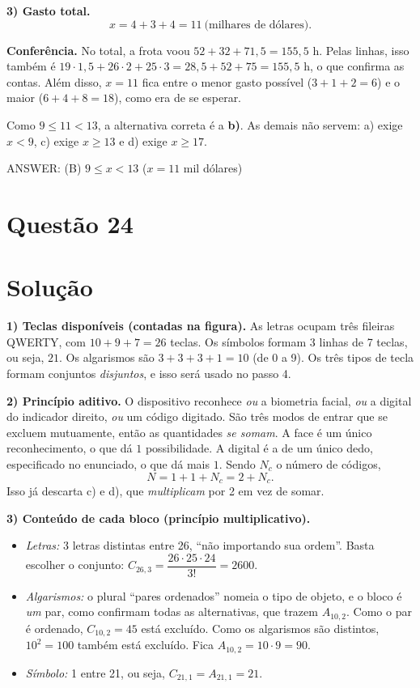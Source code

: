 \documentclass{article}%
\begin{document}
\textbf{3) Gasto total.}
\[
x=4+3+4=11 \ \text{(milhares de dólares)}.
\]

\textbf{Conferência.} No total, a frota voou $52+32+71{,}5=155{,}5$ h. Pelas linhas, isso também é $19\cdot 1{,}5+26\cdot 2+25\cdot 3=28{,}5+52+75=155{,}5$ h, o que confirma as contas. Além disso, $x=11$ fica entre o menor gasto possível ($3+1+2=6$) e o maior ($6+4+8=18$), como era de se esperar.

Como $9\le 11<13$, a alternativa correta é a \textbf{b)}. As demais não servem: a) exige $x<9$, c) exige $x\ge 13$ e d) exige $x\ge 17$.

\medskip
ANSWER: (B) $9 \le x < 13$ \quad ($x = 11$ mil dólares)%
\newpage%
\section*{Questão 24}

\section*{Solução}

\textbf{1) Teclas disponíveis (contadas na figura).} As letras ocupam três fileiras QWERTY, com $10+9+7=26$ teclas. Os símbolos formam 3 linhas de 7 teclas, ou seja, $21$. Os algarismos são $3+3+3+1=10$ (de 0 a 9). Os três tipos de tecla formam conjuntos \emph{disjuntos}, e isso será usado no passo 4.

\textbf{2) Princípio aditivo.} O dispositivo reconhece \emph{ou} a biometria facial, \emph{ou} a digital do indicador direito, \emph{ou} um código digitado. São três modos de entrar que se excluem mutuamente, então as quantidades \emph{se somam}. A face é um único reconhecimento, o que dá $1$ possibilidade. A digital é a de um único dedo, especificado no enunciado, o que dá mais $1$. Sendo $N_c$ o número de códigos,
\[
N = 1+1+N_c = 2+N_c .
\]
Isso já descarta c) e d), que \emph{multiplicam} por 2 em vez de somar.

\textbf{3) Conteúdo de cada bloco (princípio multiplicativo).}
\begin{itemize}
\item \emph{Letras:} 3 letras distintas entre 26, ``não importando sua ordem''. Basta escolher o conjunto: $C_{26,3}=\dfrac{26\cdot25\cdot24}{3!}=2600$.
\item \emph{Algarismos:} o plural ``pares ordenados'' nomeia o tipo de objeto, e o bloco é \emph{um} par, como confirmam todas as alternativas, que trazem $A_{10,2}$. Como o par é ordenado, $C_{10,2}=45$ está excluído. Como os algarismos são distintos, $10^2=100$ também está excluído. Fica $A_{10,2}=10\cdot 9=90$.
\item \emph{Símbolo:} 1 entre 21, ou seja, $C_{21,1}=A_{21,1}=21$.
\end{itemize}
\end{document}
